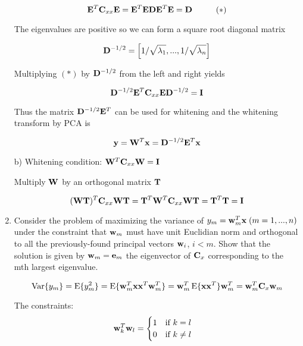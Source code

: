 \begin{enumerate}
\begin{solution}
    \[
    \mathbf{E}^T\mathbf{C}_{xx}\mathbf{E} =
    \mathbf{E}^T\mathbf{E}\mathbf{D}\mathbf{E}^T\mathbf{E} = \mathbf{D} \hspace{1cm} (*)
    \]

    The eigenvalues are positive so we can form a square root diagonal matrix

    \[
    \mathbf{D}^{-1/2} = \left[ 1/\sqrt{\lambda_1}, ..., 1/\sqrt{\lambda_n} \right]
    \]

    Multiplying $(*)$ by $\mathbf{D}^{-1/2}$ from the left and right yields

    \[
    \mathbf{D}^{-1/2}\mathbf{E}^T\mathbf{C}_{xx}\mathbf{E}\mathbf{D}^{-1/2}=\mathbf{I}
    \]

    Thus the matrix $\mathbf{D}^{-1/2}\mathbf{E}^T$ can be used for whitening
    and the whitening transform by PCA is

    \[
    \textbf{y}=\mathbf{W}^T\mathbf{x} = \mathbf{D}^{-1/2}\mathbf{E}^T\mathbf{x}
    \]

    b) Whitening condition: $\mathbf{W}^T\mathbf{C}_{xx}\mathbf{W}=\mathbf{I}$

    Multiply $\mathbf{W}$ by an orthogonal matrix $\mathbf{T}$

    \[
    (\mathbf{W}\mathbf{T})^T\mathbf{C}_{xx}\mathbf{W}\mathbf{T} = \mathbf{T}^T\mathbf{W}^T\mathbf{C}_{xx}\mathbf{W}\mathbf{T} = \mathbf{T}^T\mathbf{T} = \mathbf{I}
    \]

  \end{solution}

\item Consider the problem of maximizing the variance of $y_m = {\bf
    w}_m^T{\bf x}\; (m=1, ..., n)$ under the constraint that ${\bf
    w}_m$ must have unit Euclidian norm and orthogonal to all the
  previously-found principal vectors ${\bf w}_i$, $i<m$. Show that the
  solution is given by ${\bf w}_m={\bf e}_m$ the eigenvector of ${\bf
    C}_x$ corresponding to the mth largest eigenvalue.

  \begin{solution}

    \begin{equation}
      \operatorname{Var}\{ y_m \} = \operatorname{E} \{ y_m^2 \} = \operatorname{E} \{ \mathbf{w}_m^T \mathbf{x} \mathbf{x}^T \mathbf{w}_m^T \}
      = \mathbf{w}_m^T \operatorname{E} \{ \mathbf{x} \mathbf{x}^T \} \mathbf{w}_m^T = \mathbf{w}_m^T \mathbf{C}_x \mathbf{w}_m
    \end{equation}

    The constraints:
    \begin{equation}
      \mathbf{w}_k^T \mathbf{w}_l = \begin{cases}1 \quad\text{if $k=l$} \\
        0 \quad\text{if $k \neq l$} \end{cases}
    \end{equation}


\end{solution}
\end{enumerate}
